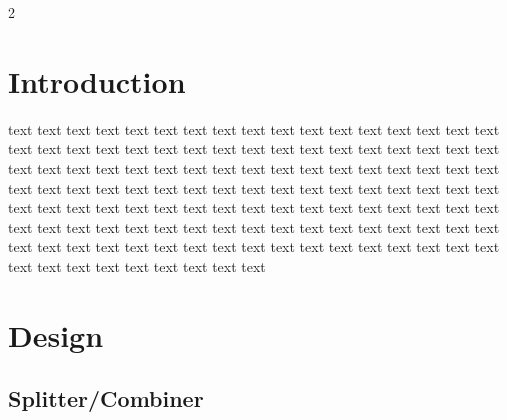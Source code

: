 \documentclass[letterpaper,10pt]{article}
\begin{document}
\begin{multicols}{2}

\section{Introduction}

text text text text text text text text text text text text text text text text text text text text text text text text text text text text text text text text text text text text text text text text text text text text text text text text text text text text text text text text text text text text text text text text text text text text text text text text text text text text text text text text text text text text text text text text text text text text text text text text text text text text text text text text text text text text text text text text text text text text text text text text text text text text text text text text \cite{Byford2017}

\section{Design}
\subsection{Splitter/Combiner}


\end{multicols}
\end{document}
